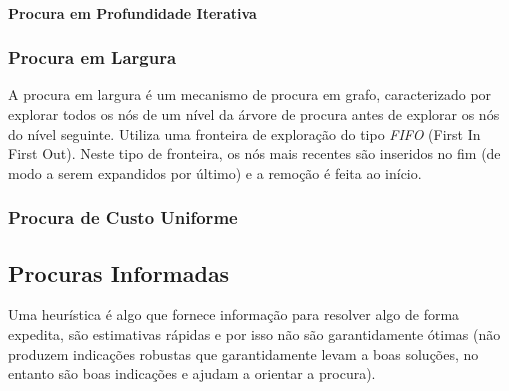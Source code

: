 \paragraph{Procura em Profundidade Iterativa}\label{par:procura-profundidade-iterativa}

\subsubsection{Procura em Largura}\label{subsubsec:procura-largura}

A procura em largura é um mecanismo de procura em grafo, caracterizado por explorar todos os nós de um nível da árvore de procura antes de explorar os nós do nível seguinte.
Utiliza uma fronteira de exploração do tipo \textit{FIFO} (First In First Out).
Neste tipo de fronteira, os nós mais recentes são inseridos no fim (de modo a serem expandidos por último) e a remoção é feita ao início.

\subsubsection{Procura de Custo Uniforme}\label{subsubsec:procura-custo-uniforme}

\subsection{Procuras Informadas}\label{subsec:procuras-informadas}

Uma heurística é algo que fornece informação para resolver algo de forma expedita, são estimativas rápidas e por isso não são garantidamente ótimas (não produzem indicações robustas que garantidamente levam a boas soluções, no entanto são boas indicações e ajudam a orientar a procura).
